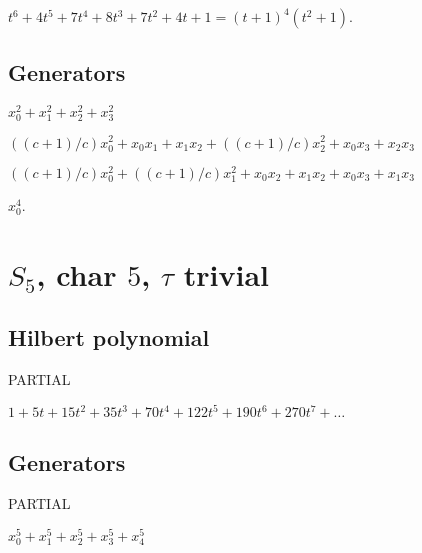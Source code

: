 \documentclass{article}
\numberwithin{equation}{section}
\begin{document}
$t^6 + 4t^5 + 7t^4 + 8t^3 + 7t^2 + 4t + 1=(t + 1)^4  (t^2 + 1)$.

\subsection{Generators}

$x_0^2 + x_1^2 + x_2^2 + x_3^2$ 

$((c + 1)/c)x_0^2 + x_0x_1 + x_1x_2 + ((c + 1)/c)x_2^2 + x_0x_3 + x_2x_3$    

$ ((c + 1)/c)x_0^2 + ((c + 1)/c)x_1^2 + x_0x_2 + x_1x_2 + x_0x_3 + x_1x_3$    

$ x_0^4$.


\section{$S_5$, char $5$, $\tau$ trivial}

\subsection{Hilbert polynomial} 

PARTIAL

$1+5t+15t^2+35t^3+70t^4+122t^5+190t^6+270t^7 + \dots$


\subsection{Generators}

PARTIAL

$x_0^5 + x_1^5 + x_2^5 + x_3^5 + x_4^5$
\end{document}

